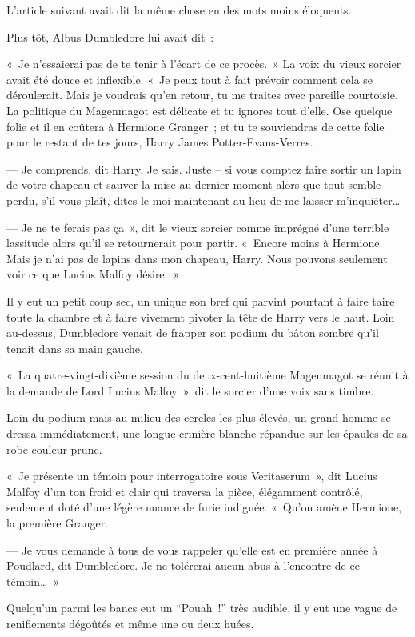 L'article suivant avait dit la même chose en des mots moins éloquents.

Plus tôt, Albus Dumbledore lui avait dit~:
\begin{em}
«~Je n'essaierai pas de te tenir à l'écart de ce procès.~» La voix du vieux sorcier avait été douce et inflexible. «~Je peux tout à fait prévoir comment cela se déroulerait. Mais je voudrais qu'en retour, tu me traites avec pareille courtoisie. La politique du Magenmagot est délicate et tu ignores tout d'elle. Ose quelque folie et il en coûtera à Hermione Granger~; et tu te souviendras de cette folie pour le restant de tes jours, Harry James Potter-Evans-Verres.

--- Je comprends, dit Harry. Je sais. Juste -- si vous comptez faire sortir un lapin de votre chapeau et sauver la mise au dernier moment alors que tout semble perdu, s'il vous plaît, dites-le-moi maintenant au lieu de me laisser m'inquiéter…

--- Je ne te ferais pas ça~», dit le vieux sorcier comme imprégné d'une terrible lassitude alors qu'il se retournerait pour partir. «~Encore moins à Hermione. Mais je n'ai pas de lapins dans mon chapeau, Harry. Nous pouvons seulement voir ce que Lucius Malfoy désire.~» \end{em}

Il y eut un petit coup sec, un unique son bref qui parvint pourtant à faire taire toute la chambre et à faire vivement pivoter la tête de Harry vers le haut. Loin au-dessus, Dumbledore venait de frapper son podium du bâton sombre qu'il tenait dans sa main gauche.

«~La quatre-vingt-dixième session du deux-cent-huitième Magenmagot se réunit à la demande de Lord Lucius Malfoy~», dit le sorcier d'une voix sans timbre.

Loin du podium mais au milieu des cercles les plus élevés, un grand homme se dressa immédiatement, une longue crinière blanche répandue sur les épaules de sa robe couleur prune.

«~Je présente un témoin pour interrogatoire sous Veritaserum~», dit Lucius Malfoy d'un ton froid et clair qui traversa la pièce, élégamment contrôlé, seulement doté d'une légère nuance de furie indignée. «~Qu'on amène Hermione, la première Granger.

--- Je vous demande à tous de vous rappeler qu'elle est en première année à Poudlard, dit Dumbledore. Je ne tolérerai aucun abus à l'encontre de ce témoin…~»

Quelqu'un parmi les bancs eut un “Pouah~!” très audible, il y eut une vague de reniflements dégoûtés et même une ou deux huées.

